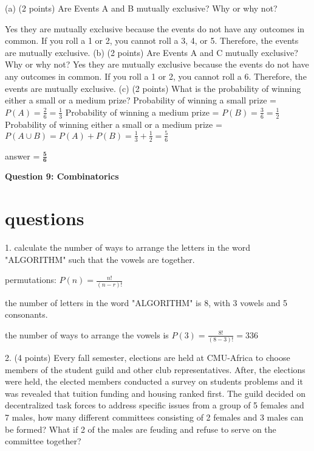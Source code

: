 \documentclass{article}
\begin{document}
(a) (2 points) Are Events A and B mutually exclusive? Why or why not?

Yes they are mutually exclusive because the events do not have any outcomes in common. If you roll a 1 or 2, you cannot roll a 3, 4, or 5. Therefore, the events are mutually exclusive.\newline
(b) (2 points) Are Events A and C mutually exclusive? Why or why not?
Yes they are mutually exclusive because the events do not have any outcomes in common. If you roll a 1 or 2, you cannot roll a 6. Therefore, the events are mutually exclusive.\newline
(c) (2 points) What is the probability of winning either a small or a medium prize?
Probability of winning a small prize = \(P(A) = \frac{2}{6} = \frac{1}{3}\)\newline
Probability of winning a medium prize = \(P(B) = \frac{3}{6} = \frac{1}{2}\)\newline
Probability of winning either a small or a medium prize = \(P(A \cup B) = P(A) + P(B) = \frac{1}{3} + \frac{1}{2} = \frac{5}{6}\)\newline

answer = \(\mathbf{\frac{5}{6}}\)\newline

\begin{center}
    \large \textbf{Question 9: Combinatorics}
\end{center}

\section{questions}

1. calculate the number of ways to arrange the letters in the word "ALGORITHM" such that the vowels are together.

permutations: \(P(n) = \frac{n!}{(n-r)!}\)

the number of letters in the word "ALGORITHM" is 8, with 3 vowels and 5 consonants.

the number of ways to arrange the vowels is \(P(3) = \frac{8!}{(8-3)!} = 336\) \newline

2. (4 points) Every fall semester, elections are held at CMU-Africa to choose members of the student
guild and other club representatives. After, the elections were held, the elected members conducted
a survey on students problems and it was revealed that tuition funding and housing ranked first.
The guild decided on decentralized task forces to address specific issues from a group of 5 females
and 7 males, how many different committees consisting of 2 females and 3 males can be formed?
What if 2 of the males are feuding and refuse to serve on the committee together?\newline
\end{document}
